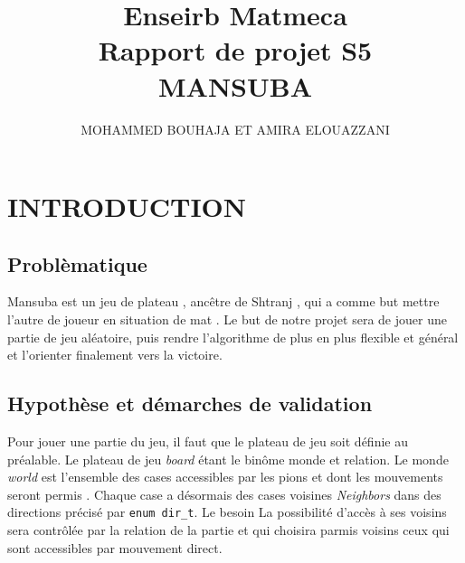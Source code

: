 \documentclass[a4paper]{article}
\begin{document}

\title{ Enseirb Matmeca \\ Rapport de projet S5 \\ MANSUBA }
\author{MOHAMMED BOUHAJA ET AMIRA ELOUAZZANI}
\maketitle





\newpage

\tableofcontents

\newpage

\begin{center}
\end{center}

\section{INTRODUCTION}
\subsection{Problèmatique}
Mansuba est un jeu de plateau , ancêtre de Shtranj , qui a comme but mettre l’autre de joueur en situation de mat . 
Le but de notre projet sera de jouer une partie de jeu aléatoire, puis rendre l'algorithme de plus en plus flexible et général
et l'orienter finalement vers la victoire. 
\subsection{Hypothèse et démarches de validation}
Pour jouer une partie du jeu, il faut que le plateau de jeu soit définie au préalable. Le plateau de jeu \textit{board}  étant le binôme monde et relation. 
Le monde \textit{world} est l’ensemble des cases accessibles par les pions et dont les mouvements seront permis . Chaque case a désormais des cases voisines \textit{Neighbors} dans des directions précisé par \lstinline|enum dir_t|.
Le besoin 
La possibilité d’accès à ses voisins sera contrôlée par la relation de la partie et qui choisira parmis voisins ceux qui sont accessibles par mouvement direct.  
\end{document}
